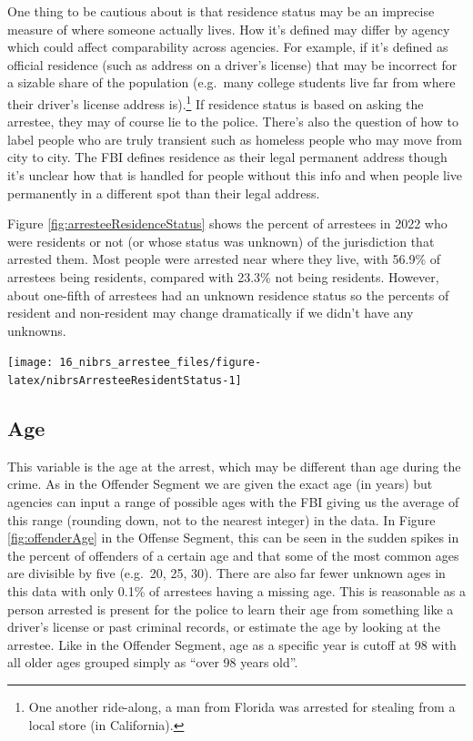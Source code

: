 \documentclass[
]{krantz}
\let\origfigure\figure
\let\endorigfigure\endfigure
\renewenvironment{figure}[1][2] {
    \expandafter\origfigure\expandafter[H]
} {
    \endorigfigure
}
\begin{document}
One thing to be cautious about is that residence status may
be an imprecise measure of where someone actually lives. How
it's defined may differ by agency which could affect
comparability across agencies. For example, if it's defined
as official residence (such as address on a driver's
license) that may be incorrect for a sizable share of the
population (e.g.~many college students live far from where
their driver's license address is).\footnote{One another
  ride-along, a man from Florida was arrested for stealing
  from a local store (in California).} If residence status
is based on asking the arrestee, they may of course lie to
the police. There's also the question of how to label people
who are truly transient such as homeless people who may move
from city to city. The FBI defines residence as their legal
permanent address though it's unclear how that is handled
for people without this info and when people live
permanently in a different spot than their legal address.

Figure \ref{fig:arresteeResidenceStatus} shows the percent
of arrestees in 2022 who were residents or not (or whose
status was unknown) of the jurisdiction that arrested them.
Most people were arrested near where they live, with 56.9\%
of arrestees being residents, compared with 23.3\% not being
residents. However, about one-fifth of arrestees had an
unknown residence status so the percents of resident and
non-resident may change dramatically if we didn't have any
unknowns.

\begin{figure}

{\centering \texttt{[image: 16\_nibrs\_arrestee\_files/figure-latex/nibrsArresteeResidentStatus-1]} 

}

\caption{Annual resident status (i.e. if they live in the arresting jurisdiction) of arrestees, 1991-2022.}\label{fig:nibrsArresteeResidentStatus}
\end{figure}

\subsection{Age}\label{age-4}

This variable is the age at the arrest, which may be
different than age during the crime. As in the Offender
Segment we are given the exact age (in years) but agencies
can input a range of possible ages with the FBI giving us
the average of this range (rounding down, not to the nearest
integer) in the data. In Figure \ref{fig:offenderAge} in the
Offense Segment, this can be seen in the sudden spikes in
the percent of offenders of a certain age and that some of
the most common ages are divisible by five (e.g.~20, 25,
30). There are also far fewer unknown ages in this data with
only 0.1\% of arrestees having a missing age. This is
reasonable as a person arrested is present for the police to
learn their age from something like a driver's license or
past criminal records, or estimate the age by looking at the
arrestee. Like in the Offender Segment, age as a specific
year is cutoff at 98 with all older ages grouped simply as
``over 98 years old''.
\end{document}
